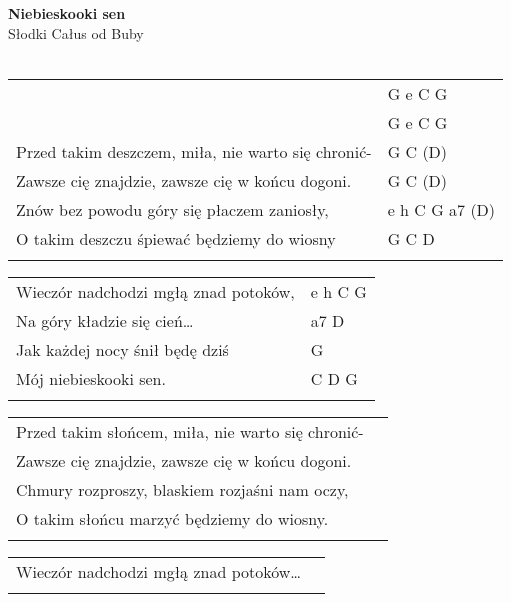 \documentclass[a5paper]{article}
\begin{document}


\noindent
\fontsize{12pt}{15pt}\selectfont
\textbf{Niebieskooki sen} \\
\fontsize{8pt}{10pt}\selectfont
Słodki Całus od Buby \\ \\
\fontsize{10pt}{12pt}\selectfont
{}
\begin{tabular}{@{}p{8.50cm}p{3cm}@{}}
\noindent
 & G e C G \\
 & G e C G \\
Przed takim deszczem, miła, nie warto się chronić- & G C (D) \\
Zawsze cię znajdzie, zawsze cię w końcu dogoni.	& G C (D) \\
Znów bez powodu góry się płaczem zaniosły, & e h C G a7 (D) \\
O takim deszczu śpiewać będziemy do wiosny & G C D \\ \\
\end{tabular}

\noindent
\begin{tabular}{@{}p{7.50cm}p{3cm}@{}}
Wieczór nadchodzi mgłą znad potoków, & e h C G \\
Na góry kładzie się cień… & a7 D \\
Jak każdej nocy śnił będę dziś & G \\
Mój niebieskooki sen. & C D G \\ \\
\end{tabular}

\noindent
\begin{tabular}{@{}p{7.50cm}p{3cm}@{}}
Przed takim słońcem, miła, nie warto się chronić- \\
Zawsze cię znajdzie, zawsze cię w końcu dogoni. \\
Chmury rozproszy, blaskiem rozjaśni nam oczy, \\
O takim słońcu marzyć będziemy do wiosny. \\ \\
\end{tabular}

\noindent
\begin{tabular}{@{}p{7.50cm}p{3cm}@{}}
Wieczór nadchodzi mgłą znad potoków… \\ \\
\end{tabular}
\end{document}
